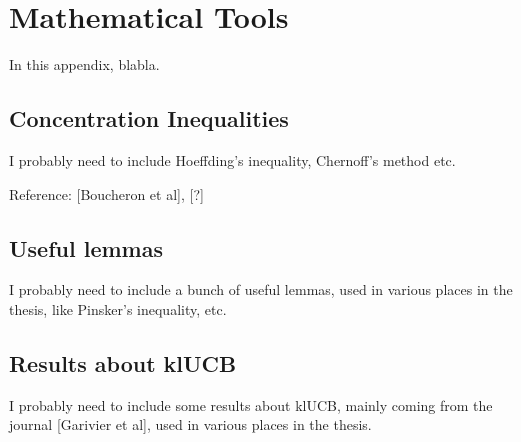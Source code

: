 \chapter{Mathematical Tools}
\label{app:1:mathsTools}

In this appendix, blabla.

\section{Concentration Inequalities}
\label{sec:app1:ConcentrationInequalities}

I probably need to include Hoeffding's inequality, Chernoff's method etc.

Reference: [Boucheron et al], [?]


\section{Useful lemmas}
\label{sec:app1:UsefulLemmas}

I probably need to include a bunch of useful lemmas, used in various places in the thesis, like Pinsker's inequality, etc.


\section{Results about klUCB}
\label{sec:app1:resultsklUCB}

I probably need to include some results about klUCB, mainly coming from the journal [Garivier et al], used in various places in the thesis.

